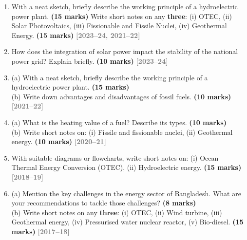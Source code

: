 \documentclass[12pt,a3paper]{article}
\newcommand{\yr}[1]{\hfill\textcolor{gray}{\small\textbf{[#1]}}}
\newcommand{\mk}[1]{\textcolor{orange!70!black}{\small\textbf{(#1 marks)}}}
\begin{document}
\begin{enumerate}
\item \label{qlabel:A1-Q1}
With a neat sketch, briefly describe the working principle of a hydroelectric power plant. \mk{15}
Write short notes on any \textbf{three}: (i) OTEC, (ii) Solar Photovoltaics, (iii) Fissionable and Fissile Nuclei, (iv) Geothermal Energy. \mk{15}
\yr{2023--24, 2021--22}




\item \label{qlabel:A1-Q2}
How does the integration of solar power impact the stability of the national power grid? Explain briefly. \mk{10}
\yr{2023--24}




\item \label{qlabel:A1-Q7}
(a) With a neat sketch, briefly describe the working principle of a hydroelectric power plant. \mk{15}\\
(b) Write down advantages and disadvantages of fossil fuels. \mk{10}
\yr{2021--22}




\item \label{qlabel:A1-Q6}
(a) What is the heating value of a fuel? Describe its types. \mk{10}\\
(b) Write short notes on: (i) Fissile and fissionable nuclei, (ii) Geothermal energy. \mk{10}
\yr{2020--21}




\item \label{qlabel:A1-Q5}
With suitable diagrams or flowcharts, write short notes on: (i) Ocean Thermal Energy Conversion (OTEC), (ii) Hydroelectric energy. \mk{15}
\yr{2018--19}




\item \label{qlabel:A1-Q4}
(a) Mention the key challenges in the energy sector of Bangladesh. What are your recommendations to tackle those challenges? \mk{8}\\
(b) Write short notes on any \textbf{three}: (i) OTEC, (ii) Wind turbine, (iii) Geothermal energy, (iv) Pressurised water nuclear reactor, (v) Bio-diesel. \mk{15}
\yr{2017--18}





\end{enumerate}
\end{document}
